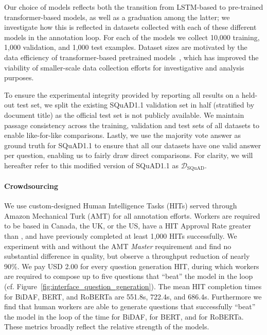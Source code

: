 \documentclass[11pt,a4paper]{article}
\newcommand{\dataset}[1]{\ensuremath{\mathcal{D_{\mathrm{#1}}}}}
\newcommand{\squadone}{SQuAD1.1}
\newif\ifarxiv
\begin{document}
{\begin{table*}[!ht]
\end{table*}


Our choice of models reflects both the transition from LSTM-based to pre-trained transformer-based models, as well as a graduation among the latter; we investigate how this is reflected in datasets collected with each of these different models in the annotation loop. 
For each of the models we collect 10,000 training, 1,000 validation, and 1,000 test examples. Dataset sizes are motivated by the data efficiency of transformer-based pretrained models~\cite{devlin2019bert,liu2019roberta}, which has improved the viability of smaller-scale data collection efforts for investigative and analysis purposes.


To ensure the experimental integrity provided by reporting all results on a held-out test set, we split the existing \squadone{} validation set in half (stratified by document title) as the official test set is not publicly available. 
We maintain passage consistency across the training, validation and test sets of all datasets to enable like-for-like comparisons.
Lastly, we use the majority vote answer as ground truth for \squadone{} to
ensure that all our datasets have one valid answer per question, enabling us to fairly draw direct comparisons.
For clarity, we will hereafter refer to this modified version of \squadone{} as \dataset{SQuAD}. 
}


\paragraph{Crowdsourcing}
We use custom-designed Human Intelligence Tasks (HITs) served through Amazon Mechanical Turk (AMT) for all annotation efforts\ifarxiv (see Appendix~\ref{sec:appendix_dataset_construction})\fi.
Workers are required to be based in Canada, the UK, or the US, have a HIT Approval Rate greater than , and have previously completed at least 1,000 HITs successfully. 
We experiment with and without the AMT \emph{Master} requirement and find no substantial difference in quality, but observe a throughput reduction of nearly 90\%.
We pay USD 2.00 for every question generation HIT, during which workers are required to compose up to five questions that ``beat'' the model in the loop (cf. Figure~\ref{fig:interface_question_generation}). 
The mean HIT completion times for BiDAF, BERT, and RoBERTa are 551.8s, 722.4s, and 686.4s.
Furthermore we find that human workers are able to generate questions that successfully ``beat'' the model in the loop  of the time for BiDAF,  for BERT, and  for RoBERTa.
These metrics broadly reflect the relative strength of the models.
\end{document}
